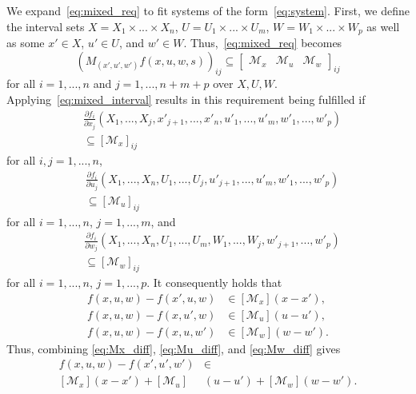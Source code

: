 \documentclass[preprint,12pt]{elsarticle}
\begin{document}
We expand~\eqref{eq:mixed_req} to fit systems of the form~\eqref{eq:system}. First, we define the interval sets $X=X_1 \times ...\times X_n$, $U=U_1 \times ...\times U_m$, $W=W_1 \times ...\times W_p$ as well as some $x' \in X$, $u' \in U$, and $w' \in W$. Thus,~\eqref{eq:mixed_req} becomes
\begin{equation}
    (M_{(x', u', w')}f(x, u, w, s))_{ij} \subseteq \begin{bmatrix}\mathcal{M}_x & \mathcal{M}_u & \mathcal{M}_w\end{bmatrix}_{ij}
\end{equation}
for all $i = 1, ..., n$ and $j = 1, ..., n+m+p$ over $X, U, W$. Applying~\eqref{eq:mixed_interval} results in this requirement being fulfilled if
\begin{align}
    &\frac{\partial f_i}{\partial x_j}(X_1, ..., X_j, x'_{j+1}, ..., x'_n, u'_1,...,u'_m, w'_1,...,w'_p) \nonumber \\
    &\subseteq [\mathcal{M}_x]_{ij}
\end{align}
for all $i,j = 1, ..., n$,
\begin{align}
    &\frac{\partial f_i}{\partial u_j}(X_1, ..., X_n,U_1, ..., U_j, u'_{j+1}, ..., u'_m, w'_1, ..., w'_p) \nonumber \\
    &\subseteq [\mathcal{M}_u]_{ij}
\end{align}
for all $i = 1, ..., n$, $j = 1, ..., m$, and
\begin{align}
    &\frac{\partial f_i}{\partial w_j}(X_1, ..., X_n, U_1, ..., U_m, W_1, ..., W_j, w'_{j+1}, ..., w'_p) \nonumber \\
    &\subseteq [\mathcal{M}_w]_{ij}
\end{align}
for all $i = 1, ..., n$, $j = 1, ..., p$. It consequently holds that
\begin{align}
    f(x, u, w) - f(x', u, w) &\in [\mathcal{M}_x](x - x'),
    \label{eq:Mx_diff} \\
    f(x, u, w) - f(x, u', w) &\in [\mathcal{M}_u](u - u'),
    \label{eq:Mu_diff} \\
    f(x, u, w) - f(x, u, w') &\in [\mathcal{M}_w](w - w').
    \label{eq:Mw_diff}
\end{align}
Thus, combining \eqref{eq:Mx_diff}, \eqref{eq:Mu_diff}, and \eqref{eq:Mw_diff} gives
\begin{align}
    f(x, u, w) - f(x', u', w') &\in  \\
    [\mathcal{M}_x](x - x') + [\mathcal{M}_u]&(u - u') + [\mathcal{M}_w](w - w'). \nonumber
\end{align}
\end{document}
